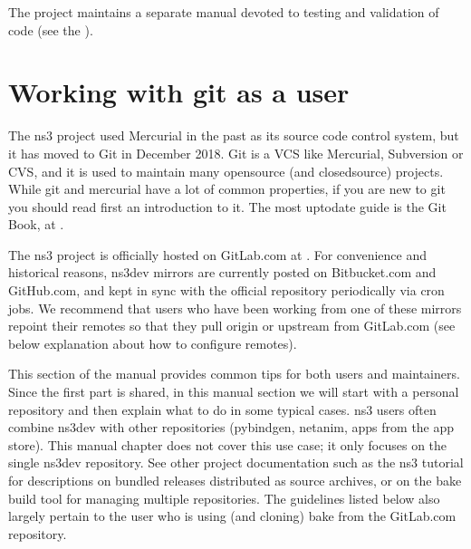 \documentclass[letterpaper,10pt,english]{sphinxmanual}
\begin{document}
The project maintains a separate manual devoted to testing and validation
of  code (see the ).


\chapter{Working with git as a user}
\label{\detokenize{working-with-git:working-with-git-as-a-user}}\label{\detokenize{working-with-git:working-with-git}}\label{\detokenize{working-with-git::doc}}
The ns\sphinxhyphen{}3 project used Mercurial in the past as its source code control system, but it has moved to Git in December 2018. Git is a VCS like Mercurial, Subversion or CVS, and it is used to maintain many open\sphinxhyphen{}source (and closed\sphinxhyphen{}source) projects. While git and mercurial have a lot of common properties, if you are new to git you should read first an introduction to it. The most up\sphinxhyphen{}to\sphinxhyphen{}date guide is the Git Book, at .

The ns\sphinxhyphen{}3 project is officially hosted on GitLab.com at .  For convenience and historical reasons, ns\sphinxhyphen{}3\sphinxhyphen{}dev mirrors are currently posted on Bitbucket.com and GitHub.com, and kept in sync with the official repository periodically via cron jobs.  We recommend that users who have been working from one of these mirrors repoint their remotes so that they pull origin or upstream from GitLab.com (see below explanation about how to configure remotes).

This section of the manual provides common tips for both users and maintainers. Since the first part is shared, in this manual section we will start with a personal repository and then explain what to do in some typical cases. ns\sphinxhyphen{}3 users often combine ns\sphinxhyphen{}3\sphinxhyphen{}dev with other repositories (pybindgen, netanim, apps from the app store).  This manual chapter does not cover this use case; it only focuses on the single ns\sphinxhyphen{}3\sphinxhyphen{}dev repository.  See other project documentation such as the ns\sphinxhyphen{}3 tutorial for descriptions on bundled releases distributed as source archives, or on the bake build tool for managing multiple repositories.  The guidelines listed below also largely pertain to the user who is using (and cloning) bake from the GitLab.com repository.
\end{document}
